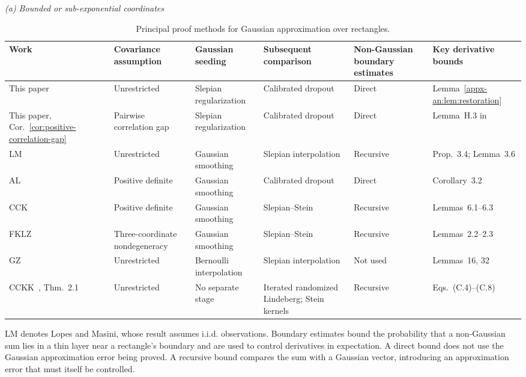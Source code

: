 \documentclass[11pt,letterpaper,twoside,leqno]{article}
\theoremstyle{bookplain}
\theoremstyle{bookremark}
\begin{document}
\begin{table}[!htb]

\centering
\small
\setlength{\tabcolsep}{4pt}
\renewcommand{\arraystretch}{1.1}
\caption{Principal proof methods for Gaussian approximation over rectangles.}
\label{tab:proof-comparison}
\smallskip
\textit{(a) Bounded or sub-exponential coordinates}\par\smallskip
{\setlength{\tabcolsep}{3pt}
\begin{tabularx}{\textwidth}{@{}>{\raggedright\arraybackslash}p{}
 >{\raggedright\arraybackslash}p{}
 >{\raggedright\arraybackslash}p{}
 >{\raggedright\arraybackslash}X
 >{\raggedright\arraybackslash}p{}
 >{\raggedright\arraybackslash}p{}@{}}
\toprule
Work & Covariance assumption & Gaussian seeding & Subsequent comparison & Non-Gaussian boundary estimates & Key derivative bounds \\
\midrule
This paper & Unrestricted & Slepian regularization & Calibrated dropout & Direct & Lemma~\ref{appx-an:lem:restoration} \\[2pt]
This paper, Cor.~\ref{cor:positive-correlation-gap} & Pairwise correlation gap & Slepian regularization & Calibrated dropout & Direct & Lemma~H.3 in~\cite{Supplement2026} \\[2pt]
LM~\cite{LopesMasini2026} & Unrestricted & Gaussian smoothing & Slepian interpolation & Recursive & Prop.~3.4; Lemma~3.6 \\[2pt]
AL~\cite{AL} & Positive definite & Gaussian smoothing & Calibrated dropout & Direct & Corollary~3.2 \\[2pt]
CCK~\cite{CCK} & Positive definite & Gaussian smoothing & Slepian--Stein & Recursive & Lemmas~6.1--6.3 \\[2pt]
FKLZ~\cite{FKLZ} & Three-coordinate nondegeneracy & Gaussian smoothing & Slepian--Stein & Recursive & Lemmas~2.2--2.3 \\[2pt]
GZ~\cite{GaoZhang} & Unrestricted & Bernoulli interpolation & Slepian interpolation & Not used & Lemmas~16, 32 \\[2pt]
CCKK~\cite{CCKK2022}, Thm.~2.1 & Unrestricted & No separate stage & Iterated randomized Lindeberg; Stein kernels & Recursive & Eqs.~(C.4)--(C.8) \\
\bottomrule
\end{tabularx}}
\smallskip
{\footnotesize\raggedright
LM denotes Lopes and Masini, whose result assumes i.i.d. observations.
Boundary estimates bound the probability that a non-Gaussian sum lies in a
thin layer near a rectangle's boundary and are used to control
derivatives in expectation. A direct bound does not use the Gaussian
approximation error being proved. A recursive bound compares the sum
with a Gaussian vector, introducing an approximation error that must
itself be controlled.\par}


\end{table}
\end{document}
